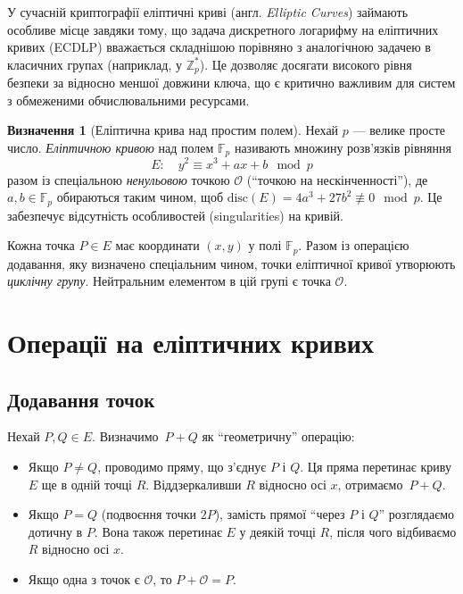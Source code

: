\documentclass[12pt]{report}
\theoremstyle{definition}
\newtheorem{definition}{Визначення}[chapter]
\theoremstyle{plain}
\begin{document}
У сучасній криптографії еліптичні криві (англ. \textit{Elliptic Curves}) займають 
особливе місце завдяки тому, що задача дискретного логарифму на еліптичних кривих 
(ECDLP) вважається складнішою порівняно з аналогічною задачею в 
класичних групах (наприклад, у \(\mathbb{Z}_p^*\)). Це дозволяє 
досягати високого рівня безпеки за відносно меншої довжини ключа, що є 
критично важливим для систем з обмеженими обчислювальними ресурсами.

\begin{definition}[Еліптична крива над простим полем]
Нехай \(p\) — велике просте число. \textit{Еліптичною кривою} над полем 
\(\mathbb{F}_p\) називають множину розв'язків рівняння
\[
   E: \quad y^2 \equiv x^3 + a x + b \mod p
\]
разом із спеціальною \textit{ненульовою} точкою \(\mathcal{O}\) (``точкою на 
нескінченності''), де \(a, b \in \mathbb{F}_p\) обираються таким чином, щоб 
\(\text{disc}(E) = 4 a^3 + 27 b^2 \not\equiv 0 \mod p\). Це забезпечує відсутність 
особливостей (singularities) на кривій.
\end{definition}

Кожна точка \(P \in E\) має координати \((x, y)\) у полі \(\mathbb{F}_p\). Разом із 
операцією додавання, яку визначено спеціальним чином, точки еліптичної кривої 
утворюють \textit{циклічну групу}. Нейтральним елементом в цій групі є точка 
\(\mathcal{O}\).

\section{Операції на еліптичних кривих}

\subsection{Додавання точок}
Нехай \(P, Q \in E\). Визначимо \(\,P + Q\) як ``геометричну'' операцію:
\begin{itemize}
    \item Якщо \(P \neq Q\), проводимо пряму, що з'єднує \(P\) і \(Q\). Ця 
          пряма перетинає криву \(E\) ще в одній точці \(R\). Віддзеркаливши \(R\) відносно 
          осі \(x\), отримаємо \(\,P+Q\).
    \item Якщо \(P = Q\) (подвоєння точки \(2P\)), замість прямої ``через \(P\) і \(Q\)'' 
          розглядаємо дотичну в \(P\). Вона також перетинає \(E\) у деякій точці \(R\), 
          після чого відбиваємо \(R\) відносно осі \(x\).
    \item Якщо одна з точок є \(\mathcal{O}\), то \(P + \mathcal{O} = P\).
\end{itemize}
\end{document}
